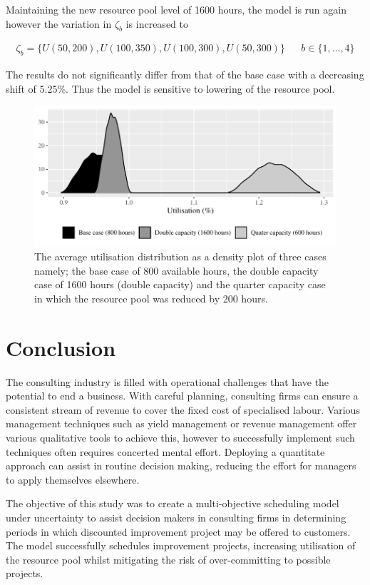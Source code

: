 \documentclass[a4paper,11pt]{article}
\begin{document}
Maintaining the new resource pool level of 1600 hours, the model is run again however the variation in $\zeta_b$ is increased to  

\begin{align}
	\zeta_b = \{U(50,200),U(100,350),U(100,300),U(50,300)\} && b\in \{1,\dots,4\}
\end{align}

The results do not significantly differ from that of the base case with a decreasing shift of 5.25\%. Thus the model is sensitive to lowering of the resource pool.

\begin{figure}[]
\label{fig:3}
\includegraphics[width=15cm]{../Images/ggsens}
\caption{The average utilisation distribution as a density plot of three cases namely; the base case of 800 available hours, the double capacity case of 1600 hours (double capacity) and the quarter capacity case in which the resource pool was reduced by 200 hours.}
\end{figure}





\section{Conclusion}
The consulting industry is filled with operational challenges that have the potential to end a business. With careful planning, consulting firms can ensure a consistent stream of revenue to cover the fixed cost of specialised labour. Various management techniques such as yield management or revenue management offer various qualitative tools to achieve this, however to successfully implement such techniques often requires concerted mental effort. Deploying a quantitate approach can assist in routine decision making, reducing the effort for managers to apply themselves elsewhere. 

The objective of this study was to create a multi-objective scheduling model under uncertainty to assist decision makers in consulting firms in determining periods in which discounted improvement project may be offered to customers. The model successfully schedules improvement projects, increasing utilisation of the resource pool whilst mitigating the risk of over-committing to possible projects. 
\end{document}
